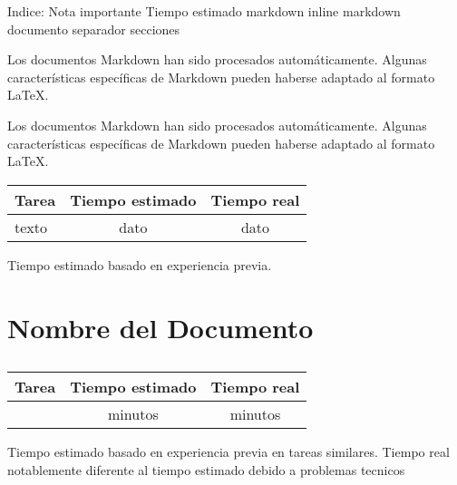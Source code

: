 Indice:
Nota importante
Tiempo estimado
markdown inline
markdown documento
separador secciones



\begin{infobox}
    Los documentos Markdown han sido procesados automáticamente. Algunas características específicas de Markdown pueden haberse adaptado al formato \LaTeX{}.
\end{infobox}


\begin{warningbox}[Atencio]
    Los documentos Markdown han sido procesados automáticamente. Algunas características específicas de Markdown pueden haberse adaptado al formato \LaTeX{}.
\end{warningbox} 


    \begin{center}
        \begin{tabular}{|l|c|c|}
            \hline
            \textbf{Tarea} & \textbf{Tiempo estimado} & \textbf{Tiempo real} \\
            \hline
            texto & dato & dato \\
            \hline
        \end{tabular}
    \end{center}
    \begin{center}
        Tiempo estimado basado en experiencia previa.
    \end{center}


\begin{markdown}
\end{markdown}


\section{Nombre del Documento}


\separadorseccion


\subsection{}
    \begin{center}
        \begin{tabular}{|l|c|c|}
            \hline
            \textbf{Tarea} & \textbf{Tiempo estimado} & \textbf{Tiempo real} \\
            \hline
             &  minutos &  minutos \\
            \hline
        \end{tabular}
    \end{center}
    \begin{center}
        Tiempo estimado basado en experiencia previa en tareas similares.
        \newline
        Tiempo real notablemente diferente al tiempo estimado debido a problemas tecnicos
    \end{center}

